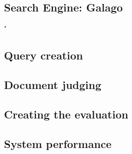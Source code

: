 \documentclass[12pt,letterpaper]{article}
\begin{document}
\subsection*{Search Engine: Galago}
"

\subsection*{Query creation}
\subsection*{Document judging}
\subsection*{Creating the evaluation}
\subsection*{System performance}
\end{document}
